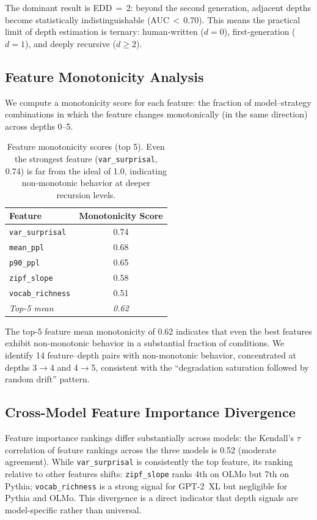 \documentclass[11pt,a4paper]{article}
\begin{document}
The dominant result is EDD\,$=$\,2: beyond the second generation, adjacent depths become statistically indistinguishable (AUC\,$<$\,0.70). This means the practical limit of depth estimation is ternary: human-written ($d=0$), first-generation ($d=1$), and deeply recursive ($d \geq 2$).

\subsection{Feature Monotonicity Analysis}

We compute a monotonicity score for each feature: the fraction of model--strategy combinations in which the feature changes monotonically (in the same direction) across depths 0--5.

\begin{table}[t]
\centering
\small
\begin{tabular}{lc}
\toprule
\textbf{Feature} & \textbf{Monotonicity Score} \\
\midrule
\texttt{var\_surprisal} & 0.74 \\
\texttt{mean\_ppl} & 0.68 \\
\texttt{p90\_ppl} & 0.65 \\
\texttt{zipf\_slope} & 0.58 \\
\texttt{vocab\_richness} & 0.51 \\
\midrule
\emph{Top-5 mean} & \emph{0.62} \\
\bottomrule
\end{tabular}
\caption{Feature monotonicity scores (top 5). Even the strongest feature (\texttt{var\_surprisal}, 0.74) is far from the ideal of 1.0, indicating non-monotonic behavior at deeper recursion levels.}
\label{tab:monotonicity}
\end{table}

The top-5 feature mean monotonicity of 0.62 indicates that even the best features exhibit non-monotonic behavior in a substantial fraction of conditions.
We identify 14 feature--depth pairs with non-monotonic behavior, concentrated at depths 3$\to$4 and 4$\to$5, consistent with the ``degradation saturation followed by random drift'' pattern.

\subsection{Cross-Model Feature Importance Divergence}

Feature importance rankings differ substantially across models: the Kendall's $\tau$ correlation of feature rankings across the three models is 0.52 (moderate agreement).
While \texttt{var\_surprisal} is consistently the top feature, its ranking relative to other features shifts: \texttt{zipf\_slope} ranks 4th on OLMo but 7th on Pythia; \texttt{vocab\_richness} is a strong signal for GPT-2~XL but negligible for Pythia and OLMo.
This divergence is a direct indicator that depth signals are model-specific rather than universal.
\end{document}
